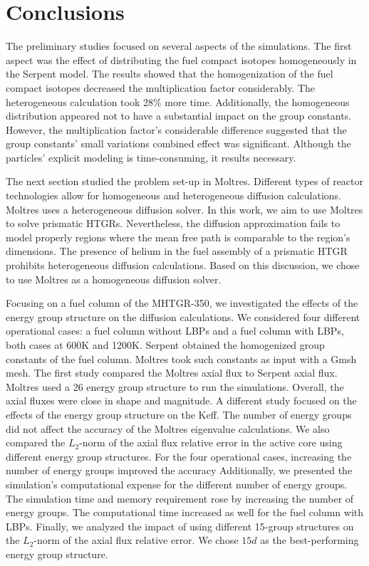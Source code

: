 \section{Conclusions}

The preliminary studies focused on several aspects of the simulations.
The first aspect was the effect of distributing the fuel compact isotopes homogeneously in the Serpent model.
The results showed that the homogenization of the fuel compact isotopes decreased the multiplication factor considerably.
The heterogeneous calculation took 28$\%$ more time.
Additionally, the homogeneous distribution appeared not to have a substantial impact on the group constants.
However, the multiplication factor's considerable difference suggested that the group constants’ small variations combined effect was significant.
Although the particles’ explicit modeling is time-consuming, it results necessary.

The next section studied the problem set-up in Moltres.
Different types of reactor technologies allow for homogeneous and heterogeneous diffusion calculations.
Moltres uses a heterogeneous diffusion solver.
In this work, we aim to use Moltres to solve prismatic HTGRs.
Nevertheless, the diffusion approximation fails to model properly regions where the mean free path is comparable to the region's dimensions.
The presence of helium in the fuel assembly of a prismatic \gls{HTGR} prohibits heterogeneous diffusion calculations.
Based on this discussion, we chose to use Moltres as a homogeneous diffusion solver.

Focusing on a fuel column of the MHTGR-350, we investigated the effects of the energy group structure on the diffusion calculations.
We considered four different operational cases: a fuel column without LBPs and a fuel column with LBPs, both cases at 600K and 1200K.
Serpent obtained the homogenized group constants of the fuel column.
Moltres took such constants as input with a Gmsh mesh.
The first study compared the Moltres axial flux to Serpent axial flux.
Moltres used a 26 energy group structure to run the simulations.
Overall, the axial fluxes were close in shape and magnitude.
A different study focused on the effects of the energy group structure on the \gls{Keff}.
The number of energy groups did not affect the accuracy of the Moltres eigenvalue calculations.
We also compared the $L_2$-norm of the axial flux relative error in the active core using different energy group structures.
For the four operational cases, increasing the number of energy groups improved the accuracy
Additionally, we presented the simulation's computational expense for the different number of energy groups.
The simulation time and memory requirement rose by increasing the number of energy groups.
The computational time increased as well for the fuel column with LBPs.
Finally, we analyzed the impact of using different 15-group structures on the $L_2$-norm of the axial flux relative error.
We chose $15d$ as the best-performing energy group structure.

